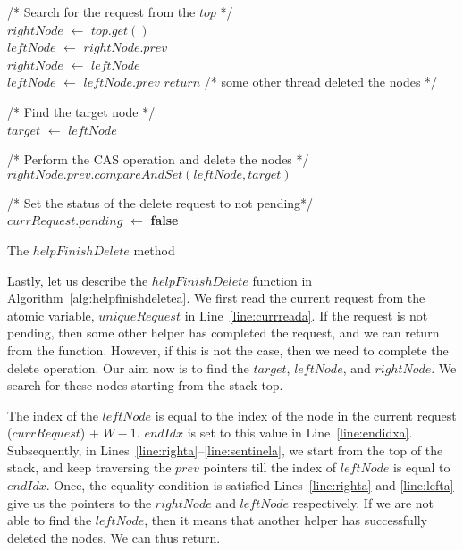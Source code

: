 \documentclass{llncs}
\begin{document}
\begin{appendix}
\begin{algorithm}
			/* Search for the request from the $top$ */ \\
			$rightNode$ $\leftarrow$ $top.get()$ \\
		    $leftNode$ $\leftarrow$ $rightNode.prev$ \\	
			 {
				$rightNode$ $\leftarrow$ $leftNode$ \label{line:righta} \\
				$leftNode$ $\leftarrow$ $leftNode.prev$ \label{line:lefta}
			}
			 {
				$return$ /* some other thread deleted the nodes */
			} \label{line:sentinela}
		
\vskip 2mm
		/* Find the target node */ \\
		$target$ $\leftarrow$ $leftNode$  \label{line:targetstarta}\\
		 \label{line:targetenda}

\vskip 2mm
		/* Perform the CAS operation and delete the nodes */\\
		$rightNode.prev.compareAndSet(leftNode, target)$ \label{line:rightcasa}

\vskip 2mm
		/* Set the status of the delete request to not pending*/ \\
		$currRequest.pending$ $\leftarrow$ \textbf{false} \label{line:setpendinga}

\caption{The $helpFinishDelete$ method} \label{alg:helpfinishdeletea}
\end{algorithm}
\normalsize
Lastly, let us describe the $helpFinishDelete$ function in Algorithm~\ref{alg:helpfinishdeletea}. 
We first read the current request from the atomic variable, $uniqueRequest$ in Line~\ref{line:currreada}. If
the request is not pending, then some other helper has completed the request, and we can return from the function.
However, if this is not the case, then we need to complete the delete operation. Our aim now is to find the $target$,
$leftNode$, and $rightNode$. We search for these nodes starting from the stack top.

The index of the $leftNode$ is equal to the index of the node in the current request ($currRequest$) + $W-1$. 
$endIdx$ is set to this value in Line~\ref{line:endidxa}.
Subsequently, in Lines~\ref{line:righta}--\ref{line:sentinela}, we start from the top of the stack, and keep traversing the $prev$
pointers till the index of $leftNode$ is equal to $endIdx$. Once, the equality condition is satisfied
Lines~\ref{line:righta} and \ref{line:lefta} give us the pointers to the $rightNode$ and $leftNode$ respectively. If
we are not able to find the $leftNode$, then it means that another helper has successfully deleted the nodes. We can
thus return. 


\end{appendix}
\end{document}
